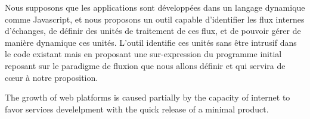 Nous supposons que les applications sont développées dans un langage dynamique comme Javascript, et nous proposons un outil capable d'identifier les flux internes d'échanges, de définir des unités de traitement de ces flux, et de pouvoir gérer de manière dynamique ces unités.
L'outil identifie ces unités sans être intrusif dans le code existant mais en proposant une sur-expression du programme initial reposant sur le paradigme de fluxion que nous allons définir et qui servira de cœur à notre proposition.



The growth of web platforms is caused partially by the capacity of internet to favor services develelpment with the quick release of a minimal product.
